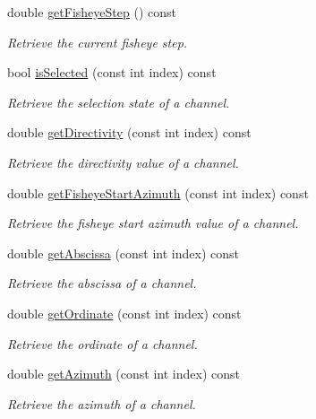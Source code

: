 \begin{DoxyCompactItemize}
double \hyperlink{class_hoa2_d_1_1_channel_manager_a1acfbabba0b33364370e54910caa4434}{get\-Fisheye\-Step} () const 
\begin{DoxyCompactList}\small\item\em Retrieve the current fisheye step. \end{DoxyCompactList}\item 
bool \hyperlink{class_hoa2_d_1_1_channel_manager_a2f3845ef03c4970491c2433f67e321fa}{is\-Selected} (const int index) const 
\begin{DoxyCompactList}\small\item\em Retrieve the selection state of a channel. \end{DoxyCompactList}\item 
double \hyperlink{class_hoa2_d_1_1_channel_manager_a216685534ec1e330dfdc09e9cbdb67d3}{get\-Directivity} (const int index) const 
\begin{DoxyCompactList}\small\item\em Retrieve the directivity value of a channel. \end{DoxyCompactList}\item 
double \hyperlink{class_hoa2_d_1_1_channel_manager_a38eba3f777b1e59025d92f5e8d18e06d}{get\-Fisheye\-Start\-Azimuth} (const int index) const 
\begin{DoxyCompactList}\small\item\em Retrieve the fisheye start azimuth value of a channel. \end{DoxyCompactList}\item 
double \hyperlink{class_hoa2_d_1_1_channel_manager_ad6e15177984616659ed54c79e75e54d0}{get\-Abscissa} (const int index) const 
\begin{DoxyCompactList}\small\item\em Retrieve the abscissa of a channel. \end{DoxyCompactList}\item 
double \hyperlink{class_hoa2_d_1_1_channel_manager_ac821f6df0cf96630d6f6aefc2b4bb7ce}{get\-Ordinate} (const int index) const 
\begin{DoxyCompactList}\small\item\em Retrieve the ordinate of a channel. \end{DoxyCompactList}\item 
double \hyperlink{class_hoa2_d_1_1_channel_manager_a149968ad122a07263e8750d3f4f00b6c}{get\-Azimuth} (const int index) const 
\begin{DoxyCompactList}\small\item\em Retrieve the azimuth of a channel. \end{DoxyCompactList}\end{DoxyCompactItemize}


